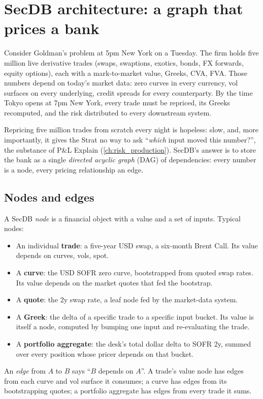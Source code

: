 \section{SecDB architecture: a graph that prices a bank}
\label{sec:secdb_arch}

Consider Goldman's problem at 5pm New York on a Tuesday.  The firm
holds five million live derivative trades (swaps, swaptions,
exotics, bonds, FX forwards, equity options), each with a
mark-to-market value, Greeks, CVA, FVA.  Those numbers depend on
today's market data: zero curves in every currency, vol surfaces
on every underlying, credit spreads for every counterparty.  By
the time Tokyo opens at 7pm New York, every trade must be
repriced, its Greeks recomputed, and the risk distributed to every
downstream system.

Repricing five million trades from scratch every night is hopeless:
slow, and, more importantly, it gives the Strat no way to
ask ``\emph{which} input moved this number?'', the substance of
P\&L Explain (\cref{ch:risk_production}).  SecDB's answer is to
store the bank as a single \emph{directed acyclic graph} (DAG) of
dependencies: every number is a node, every pricing relationship
an edge.

\subsection{Nodes and edges}

A SecDB \emph{node} is a financial object with a value and a set of
inputs.  Typical nodes:
\begin{itemize}
  \item An individual \textbf{trade}: a five-year USD swap, a
    six-month Brent Call.  Its value depends on curves, vols, spot.
  \item A \textbf{curve}: the USD SOFR zero curve, bootstrapped
    from quoted swap rates.  Its value depends on the market quotes
    that fed the bootstrap.
  \item A \textbf{quote}: the 2y swap rate, a leaf node fed by
    the market-data system.
  \item A \textbf{Greek}: the delta of a specific trade to a
    specific input bucket.  Its value is itself a node, computed by
    bumping one input and re-evaluating the trade.
  \item A \textbf{portfolio aggregate}: the desk's total dollar
    delta to SOFR 2y, summed over every position whose pricer
    depends on that bucket.
\end{itemize}
An \emph{edge} from $A$ to $B$ says ``$B$ depends on $A$''.  A
trade's value node has edges from each curve and vol surface it
consumes; a curve has edges from its bootstrapping quotes; a
portfolio aggregate has edges from every trade it sums.

